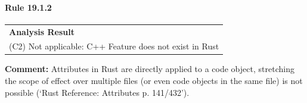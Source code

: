 \paragraph{Rule 19.1.2}
\begin{longtable}{p{13cm}}
\textbf{Analysis Result} \\
(C2) Not applicable: C++ Feature does not exist in Rust \\
\end{longtable}
\textbf{Comment:} Attributes in Rust are directly applied to a code object, stretching the scope of effect over multiple files (or even code objects in the same file) is not possible (`Rust Reference: Attributes p. 141/432'). \\
